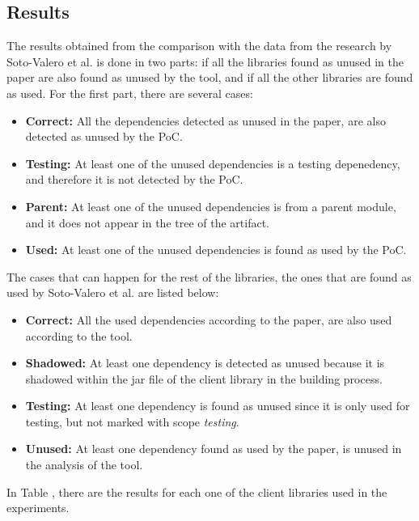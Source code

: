 \subsection{Results}

The results obtained from the comparison with the data from the research by Soto-Valero et al. is done in two parts: if all the libraries found as unused in the paper are also found as unused by the tool, and if all the other libraries are found as used. For the first part, there are several cases:

\begin{itemize}
  \item \textbf{Correct:} All the dependencies detected as unused in the paper, are also detected as unused by the PoC.
  \item \textbf{Testing:} At least one of the unused dependencies is a testing depenedency, and therefore it is not detected by the PoC.
  \item \textbf{Parent:} At least one of the unused dependencies is from a parent module, and it does not appear in the tree of the artifact.
  \item \textbf{Used:} At least one of the unused dependencies is found as used by the PoC.
\end{itemize}

The cases that can happen for the rest of the libraries, the ones that are found as used by Soto-Valero et al. are listed below:

\begin{itemize}
  \item \textbf{Correct:} All the used dependencies according to the paper, are also used according to the tool.
  \item \textbf{Shadowed:} At least one dependency is detected as unused because it is shadowed within the jar file of the client library in the building process.
  \item \textbf{Testing:} At least one dependency is found as unused since it is only used for testing, but not marked with scope \textit{testing}.
  \item \textbf{Unused:} At least one dependency found as used by the paper, is unused in the analysis of the tool.
\end{itemize}

In Table , there are the results for each one of the client libraries used in the experiments.

